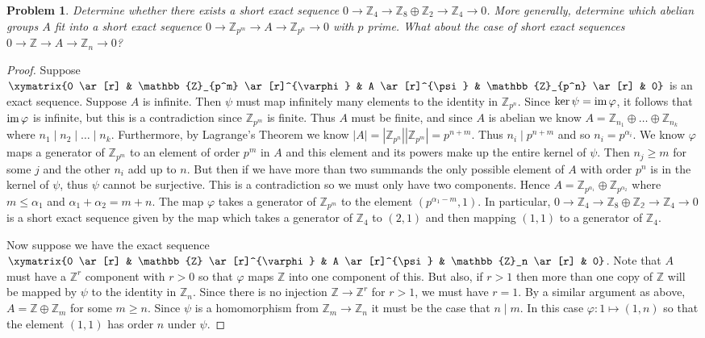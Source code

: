 \documentclass{article}
\newcommand{\im}{\textup{im}\,}
\newtheorem{problem}{Problem}
\begin{document}
\begin{problem}
Determine whether there exists a short exact sequence $0 \to \mathbb{Z}_4 \to \mathbb{Z}_8 \oplus \mathbb{Z}_2 \to \mathbb{Z}_4 \to 0$. More generally, determine which abelian groups $A$ fit into a short exact sequence $0 \to \mathbb{Z}_{p^m} \to A \to \mathbb{Z}_{p^n} \to 0$ with $p$ prime. What about the case of short exact sequences $0 \to \mathbb{Z} \to A \to \mathbb{Z}_n \to 0$?
\end{problem}
\begin{proof}
Suppose $\xymatrix{0 \ar[r] & \mathbb{Z}_{p^m} \ar[r]^{\varphi} & A \ar[r]^{\psi} & \mathbb{Z}_{p^n} \ar[r] & 0}$ is an exact sequence. Suppose $A$ is infinite. Then $\psi$ must map infinitely many elements to the identity in $\mathbb{Z}_{p^n}$. Since $\ker \psi = \im \varphi$, it follows that $\im \varphi$ is infinite, but this is a contradiction since $\mathbb{Z}_{p^m}$ is finite. Thus $A$ must be finite, and since $A$ is abelian we know $A = \mathbb{Z}_{n_1} \oplus \dots \oplus \mathbb{Z}_{n_k}$ where $n_1 \mid n_2 \mid \dots \mid n_k$. Furthermore, by Lagrange's Theorem we know $|A| = |\mathbb{Z}_{p^n}||\mathbb{Z}_{p^m}| = p^{n+m}$. Thus $n_i \mid p^{n+m}$ and so $n_i = p^{\alpha_i}$. We know $\varphi$ maps a generator of $\mathbb{Z}_{p^m}$ to an element of order $p^m$ in $A$ and this element and its powers make up the entire kernel of $\psi$. Then $n_j \geq m$ for some $j$ and the other $n_i$ add up to $n$. But then if we have more than two summands the only possible element of $A$ with order $p^n$ is in the kernel of $\psi$, thus $\psi$ cannot be surjective. This is a contradiction so we must only have two components. Hence $A = \mathbb{Z}_{p^{\alpha_1}} \oplus \mathbb{Z}_{p^{\alpha_2}}$ where $m \leq \alpha_1$ and $\alpha_1 + \alpha_2 = m + n$. The map $\varphi$ takes a generator of $\mathbb{Z}_{p^m}$ to the element $(p^{\alpha_1 - m}, 1)$. In particular, $0 \to \mathbb{Z}_4 \to \mathbb{Z}_8 \oplus \mathbb{Z_2} \to \mathbb{Z}_4 \to 0$ is a short exact sequence given by the map which takes a generator of $\mathbb{Z}_4$ to $(2,1)$ and then mapping $(1,1)$ to a generator of $\mathbb{Z}_4$.

Now suppose we have the exact sequence $\xymatrix{0 \ar[r] & \mathbb{Z} \ar[r]^{\varphi} & A \ar[r]^{\psi} & \mathbb{Z}_n \ar[r] & 0}$. Note that $A$ must have a $\mathbb{Z}^r$ component with $r > 0$ so that $\varphi$ maps $\mathbb{Z}$ into one component of this. But also, if $r > 1$ then more than one copy of $\mathbb{Z}$ will be mapped by $\psi$ to the identity in $\mathbb{Z}_n$. Since there is no injection $\mathbb{Z} \to \mathbb{Z}^r$ for $r > 1$, we must have $r = 1$. By a similar argument as above, $A = \mathbb{Z} \oplus \mathbb{Z}_m$ for some $m \geq n$. Since $\psi$ is a homomorphism from $\mathbb{Z}_m \to \mathbb{Z}_n$ it must be the case that $n \mid m$. In this case $\varphi : 1 \mapsto (1,n)$ so that the element $(1,1)$ has order $n$ under $\psi$.
\end{proof}
\end{document}
